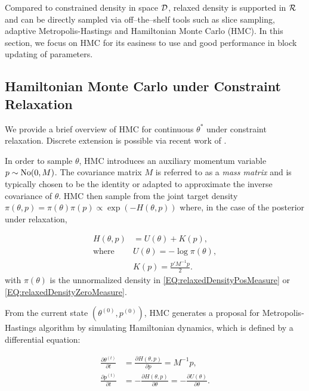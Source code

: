 \documentclass[10pt,fleqn]{article} \pdfoutput=1
\DeclareMathOperator{\1}{\mathbbm{1}} \DeclareMathOperator{\bigO}{\mc O}
\newcommand{\mass}{M} %
\begin{document}
Compared to constrained density in  space $\mathcal{D}$, relaxed density is supported in $\mathcal{R}$ and can be directly
sampled via off--the--shelf tools such as slice
sampling, adaptive Metropolis-Hastings and Hamiltonian Monte Carlo (HMC).
In this section, we focus on HMC for its easiness to use and good
performance in block updating of parameters.

\subsection{Hamiltonian Monte Carlo under Constraint Relaxation}

We provide a brief overview of HMC for continuous $\theta^*$ under
constraint relaxation. Discrete extension is possible via recent work of
\cite{nishimura2017discontinuous}.

In order to sample $\theta$, HMC introduces an auxiliary momentum variable $p
\sim \No(0, \mass)$. The covariance matrix $\mass$ is referred to as a
\textit{mass matrix} and is typically chosen to be the identity or adapted
to approximate the inverse covariance of $\theta$. HMC then sample from the
joint target density $\pi(\theta, p) = \pi(\theta) \pi(p) \propto \exp (- H(\theta, p))$
where, in the case of the posterior under relaxation,


\begin{equation} \begin{aligned}
H(\theta, p) & = U(\theta)+K(p), \\ \text{where } &
U(\theta) = -\log\pi(\theta),    \\ & K(p) = \frac{p'\mass^{-1} p}{2}.
\end{aligned}
\end{equation}
with $\pi(\theta)$ is the unnormalized density in \eqref{EQ:relaxedDensityPosMeasure} or \eqref{EQ:relaxedDensityZeroMeasure}.

From the current state $(\theta^{(0)},p^{(0)})$, HMC generates a proposal for
Metropolis-Hastings algorithm by simulating Hamiltonian dynamics, which is
defined by a differential equation:

\begin{equation} \begin{aligned} \label{hamiltonian} \frac{\partial \theta
^{(t)}}{\partial t} & =\frac{\partial H(\theta, p)}{\partial p} =
\mass^{-1}p,                                                      \\ \frac{\partial p^{(t)}}{\partial t}&
=-\frac{\partial H(\theta, p)}{\partial \theta} = -\frac{\partial
U(\theta)}{\partial \theta}.\end{aligned} \end{equation}
\end{document}

